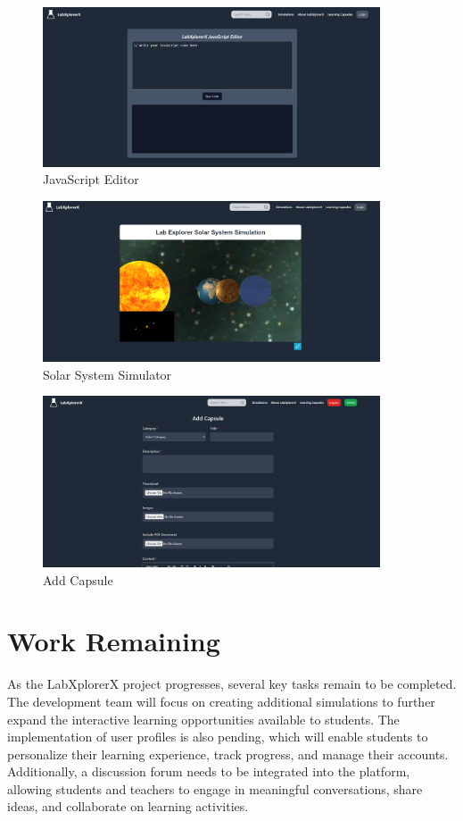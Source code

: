  \begin{figure}[H]
    \centering
     \includegraphics[width = 10cm]{Diagrams/output/js.png}
     \caption{JavaScript Editor}
 \end{figure}

 \begin{figure}[H]
    \centering
     \includegraphics[width = 10cm]{Diagrams/output/solar.png}
     \caption{Solar System Simulator}
 \end{figure}

 \begin{figure}[H]
    \centering
     \includegraphics[width = 10cm]{Diagrams/output/addcapsule.png}
     \caption{Add Capsule}
 \end{figure}
\section{Work Remaining}
As the LabXplorerX project progresses, several key tasks remain to be completed. The development team will focus on creating additional simulations to further expand the interactive learning opportunities available to students. The implementation of user profiles is also pending, which will enable students to personalize their learning experience, track progress, and manage their accounts. Additionally, a discussion forum needs to be integrated into the platform, allowing students and teachers to engage in meaningful conversations, share ideas, and collaborate on learning activities.

